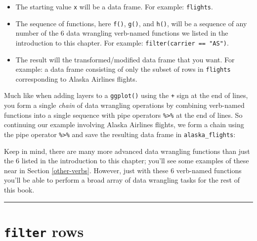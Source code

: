 \documentclass[12pt, krantz2,]{krantz}
\makeatletter
\newenvironment{Shaded}{\begin{snugshade}}{\end{snugshade}}
\newcommand{\KeywordTok}[1]{\textcolor[rgb]{0.27,0.27,0.27}{\textbf{#1}}}
\newcommand{\NormalTok}[1]{#1}
\newcommand{\OperatorTok}[1]{\textcolor[rgb]{0.43,0.43,0.43}{\textbf{#1}}}
\newcommand{\StringTok}[1]{\textcolor[rgb]{0.5,0.5,0.5}{#1}}
\providecommand{\tightlist}{%
  \setlength{\itemsep}{0pt}\setlength{\parskip}{0pt}}
\newenvironment{kframe}{%
\medskip{}
\setlength{\fboxsep}{.8em}
 \def\at@end@of@kframe{}%
 \ifinner\ifhmode%
  \def\at@end@of@kframe{\end{minipage}}%
  \begin{minipage}{\columnwidth}%
 \fi\fi%
 \def\FrameCommand##1{\hskip\@totalleftmargin \hskip-\fboxsep
 \colorbox{shadecolor}{##1}\hskip-\fboxsep
     \hskip-\linewidth \hskip-\@totalleftmargin \hskip\columnwidth}%
 \MakeFramed {\advance\hsize-\width
   \@totalleftmargin\z@ \linewidth\hsize
   \@setminipage}}%
 {\par\unskip\endMakeFramed%
 \at@end@of@kframe}
\renewenvironment{Shaded}{\begin{kframe}}{\end{kframe}}
\makeatother
\begin{document}
\begin{itemize}
\tightlist
\item
  The starting value \texttt{x} will be a data frame. For example: \texttt{flights}.
\item
  The sequence of functions, here \texttt{f()}, \texttt{g()}, and \texttt{h()}, will be a sequence of any number of the 6 data wrangling verb-named functions we listed in the introduction to this chapter. For example: \texttt{filter(carrier\ ==\ "AS")}.
\item
  The result will the transformed/modified data frame that you want. For example: a data frame consisting of only the subset of rows in \texttt{flights} corresponding to Alaska Airlines flights.
\end{itemize}

Much like when adding layers to a \texttt{ggplot()} using the \texttt{+} sign at the end of lines, you form a single \emph{chain} of data wrangling operations by combining verb-named functions into a single sequence with pipe operators \texttt{\%\textgreater{}\%} at the end of lines. So continuing our example involving Alaska Airlines flights, we form a chain using the pipe operator \texttt{\%\textgreater{}\%} and save the resulting data frame in \texttt{alaska\_flights}:

\begin{Shaded}
\end{Shaded}

Keep in mind, there are many more advanced data wrangling functions than just the 6 listed in the introduction to this chapter; you'll see some examples of these near in Section \ref{other-verbs}. However, just with these 6 verb-named functions you'll be able to perform a broad array of data wrangling tasks for the rest of this book.

\begin{center}\rule{0.5\linewidth}{\linethickness}\end{center}

\hypertarget{filter}{%
\section{\texorpdfstring{\texttt{filter} rows}{filter rows}}\label{filter}}
\end{document}
